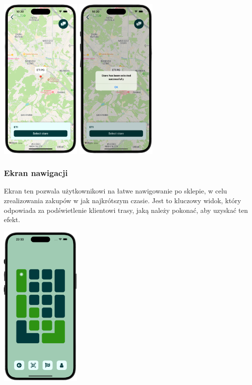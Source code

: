 \begin{center}
    \includegraphics[width=0.3\textwidth]{images/front/store_selected.png}
    \includegraphics[width=0.3\textwidth]{images/front/store_success.png}
\end{center}


\subsubsection{Ekran nawigacji}

Ekran ten pozwala użytkownikowi na łatwe nawigowanie po sklepie, w celu zrealizowania zakupów w jak najkrótszym czasie. Jest to kluczowy widok, który odpowiada za podświetlenie klientowi trasy, jaką należy pokonać, aby uzyskać ten efekt.

\begin{center}
\includegraphics[width=0.3\textwidth]{images/front/navigation_page.png}
\end{center}


